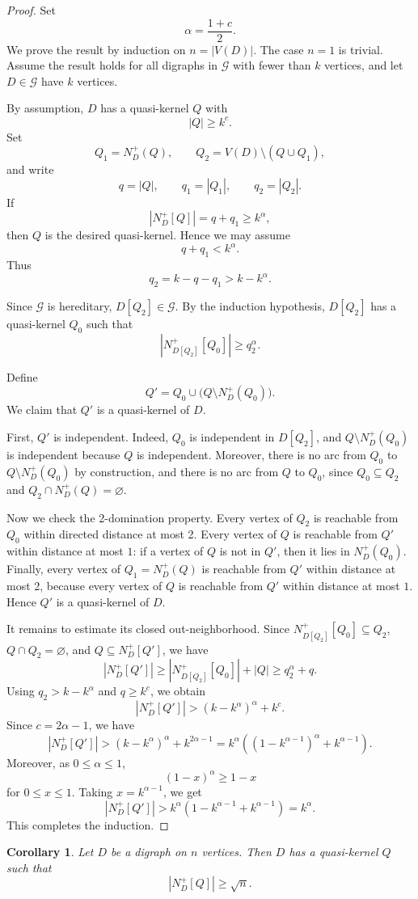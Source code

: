 \documentclass[11pt,a4paper]{article}
\newtheorem{corollary}[theorem]{Corollary}
\begin{document}
\begin{proof}
Set
\[
    \alpha=\frac{1+c}{2}.
\]
We prove the result by induction on \(n=|V(D)|\). The case \(n=1\) is trivial.
Assume the result holds for all digraphs in \(\mathcal G\) with fewer than
\(k\) vertices, and let \(D\in\mathcal G\) have \(k\) vertices.

By assumption, \(D\) has a quasi-kernel \(Q\) with
\[
    |Q|\ge k^c.
\]
Set
\[
    Q_1=N_D^+(Q), \qquad
    Q_2=V(D)\setminus (Q\cup Q_1),
\]
and write
\[
    q=|Q|,\qquad q_1=|Q_1|,\qquad q_2=|Q_2|.
\]
If
\[
    |N_D^+[Q]|=q+q_1\ge k^\alpha,
\]
then \(Q\) is the desired quasi-kernel. Hence we may assume
\[
    q+q_1<k^\alpha.
\]
Thus
\[
    q_2=k-q-q_1>k-k^\alpha.
\]

Since \(\mathcal G\) is hereditary, \(D[Q_2]\in\mathcal G\). By the induction
hypothesis, \(D[Q_2]\) has a quasi-kernel \(Q_0\) such that
\[
    |N_{D[Q_2]}^+[Q_0]|\ge q_2^\alpha.
\]

Define
\[
    Q'=Q_0\cup \bigl(Q\setminus N_D^+(Q_0)\bigr).
\]
We claim that \(Q'\) is a quasi-kernel of \(D\).

First, \(Q'\) is independent. Indeed, \(Q_0\) is independent in \(D[Q_2]\), and
\(Q\setminus N_D^+(Q_0)\) is independent because \(Q\) is independent. Moreover,
there is no arc from \(Q_0\) to \(Q\setminus N_D^+(Q_0)\) by construction, and
there is no arc from \(Q\) to \(Q_0\), since \(Q_0\subseteq Q_2\) and
\(Q_2\cap N_D^+(Q)=\varnothing\).

Now we check the 2-domination property. Every vertex of \(Q_2\) is reachable
from \(Q_0\) within directed distance at most 2. Every vertex of \(Q\) is
reachable from \(Q'\) within distance at most \(1\): if a vertex of \(Q\) is not
in \(Q'\), then it lies in \(N_D^+(Q_0)\). Finally, every vertex of
\(Q_1=N_D^+(Q)\) is reachable from \(Q'\) within distance at most 2, because
every vertex of \(Q\) is reachable from \(Q'\) within distance at most \(1\).
Hence \(Q'\) is a quasi-kernel of \(D\).

It remains to estimate its closed out-neighborhood. Since
\(N_{D[Q_2]}^+[Q_0]\subseteq Q_2\), \(Q\cap Q_2=\varnothing\), and
\(Q\subseteq N_D^+[Q']\), we have
\[
    |N_D^+[Q']|
    \ge |N_{D[Q_2]}^+[Q_0]|+|Q|
    \ge q_2^\alpha+q.
\]
Using \(q_2>k-k^\alpha\) and \(q\ge k^c\), we obtain
\[
    |N_D^+[Q']|
    > (k-k^\alpha)^\alpha+k^c.
\]
Since \(c=2\alpha-1\), we have
\[
    |N_D^+[Q']|>(k-k^\alpha)^\alpha+k^{2\alpha-1} = k^\alpha \left((1-k^{\alpha - 1})^\alpha + k ^{\alpha -1}\right).
\]
Moreover, as \(0\le \alpha\le 1\),
\[
    (1-x)^\alpha\ge 1-x
\]
for \(0\le x\le 1\). Taking \(x=k^{\alpha-1}\), we get
\[
    |N_D^+[Q']|> k^\alpha(1-k ^{\alpha -1}+k ^{\alpha -1}) = k^\alpha.
\]
This completes the induction.
\end{proof}
\begin{corollary}
Let \(D\) be a digraph on \(n\) vertices. Then \(D\) has a quasi-kernel \(Q\)
such that
\[
    |N_D^+[Q]|\ge \sqrt n .
\]
\end{corollary}
\end{document}
